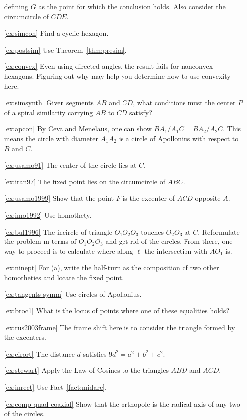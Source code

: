 \documentclass[12pt]{book}
\newcounter{exc}
\numberwithin{exc}{section}
\numberwithin{figure}{section}
\numberwithin{equation}{theorem}
\begin{document}
\begin{itemize}
defining $G$ as the point for which the conclusion holds. Also 
consider the circumcircle of $CDE$.
\item[\ref{ex:simcon}]
Find a cyclic hexagon.
\item[\ref{ex:postsim}]
Use Theorem~\ref{thm:presim}.
\item[\ref{ex:convex}]
Even using directed angles, the 
result fails for nonconvex hexagons. Figuring out why may help
you determine how to use convexity here.
\item[\ref{ex:simsynth}]
Given segments $AB$ and $CD$, what conditions must the center 
$P$ of a spiral similarity carrying $AB$ to $CD$ satisfy?
\item[\ref{ex:apcon}]
By Ceva and Menelaus, one can show $BA_1/A_1C = BA_2/A_2C$. This means 
the circle with diameter $A_1A_2$ is a circle of Apollonius with 
respect to $B$ and $C$.
\item[\ref{ex:usamo91}]
The center of the circle lies at $C$.
\item[\ref{ex:iran97}]
The fixed point lies on the circumcircle of $ABC$.
\item[\ref{ex:usamo1999}]
Show that the point $F$ is the excenter of $ACD$ opposite $A$.
\item[\ref{ex:imo1992}]
Use homothety.
\item[\ref{ex:bul1996}]
The incircle of triangle $O_1O_2O_3$ touches $O_2O_3$ at $C$. Reformulate
the problem in terms of $O_1O_2O_3$ and get rid of the circles. From there,
one way to proceed is to calculate where along $\ell$ the intersection
with $AO_1$ is.
\item[\ref{ex:ninept}]
For (a), write the half-turn as the 
composition of two other homotheties and locate the fixed point.
\item[\ref{ex:tangents symm}]
Use circles of Apollonius.
\item[\ref{ex:broc1}]
What is the locus of points where one of these equalities 
holds?
\item[\ref{ex:rus2003frame}]
The frame shift here is to consider the triangle formed by the excenters.
\item[\ref{ex:cirort}] The distance $d$ satisfies
$9 d^2 = a^2 + b^2 + c^2$.
\item[\ref{ex:stewart}]
Apply the Law of Cosines to the triangles $ABD$ and $ACD$.
\item[\ref{ex:inrect}]
Use
Fact~\ref{fact:midarc}.
\item[\ref{ex:comp quad coaxial}]
Show that the orthopole is the radical axis of any two of the circles.

\end{itemize}
\end{document}

